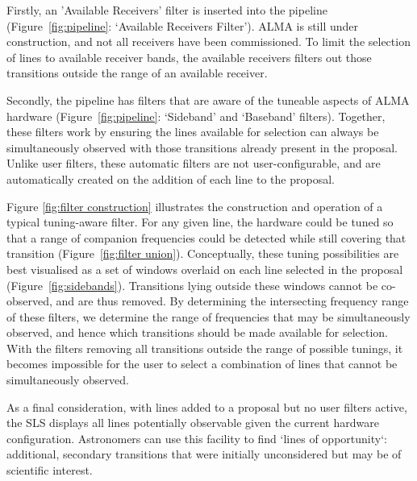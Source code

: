Firstly, an 'Available Receivers' filter is inserted into the pipeline  (Figure~\ref{fig:pipeline}: `Available Receivers Filter'). ALMA is still under construction, and not all receivers have been commissioned. To limit the selection of lines to available receiver bands, the available receivers filters out those transitions outside the range of an available receiver. 

Secondly, the pipeline has filters that are aware of the tuneable aspects of ALMA hardware (Figure~\ref{fig:pipeline}: `Sideband' and `Baseband' filters). Together, these filters work by ensuring the lines available for selection can always be simultaneously observed with those transitions already present in the proposal. Unlike user filters, these automatic filters are not user-configurable, and are automatically created on the addition of each line to the proposal. 

Figure \ref{fig:filter construction} illustrates the construction and operation of a typical tuning-aware filter. For any given line, the hardware could be tuned so that a range of companion frequencies could be detected while still covering that transition (Figure~\ref{fig:filter union}). Conceptually, these tuning possibilities are best visualised as a set of windows overlaid on each line selected in the proposal (Figure~\ref{fig:sidebands}). Transitions lying outside these windows cannot be co-observed, and are thus removed. By determining the intersecting frequency range of these filters, we determine the range of frequencies that may be simultaneously observed, and hence which transitions should be made available for selection. With the filters removing all transitions outside the range of possible tunings, it becomes impossible for the user to select a combination of lines that cannot be simultaneously observed.

As a final consideration, with lines added to a proposal but no user filters active, the SLS displays all lines potentially observable given the current hardware configuration. Astronomers can use this facility to find `lines of opportunity`: additional, secondary transitions that were initially unconsidered but may be of scientific interest.

